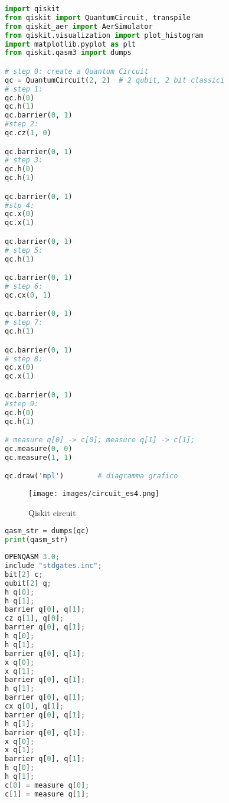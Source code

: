 \begin{lstlisting}[language=Python, caption={Qiskit code}, label={lst:qiskit-circuit}]
import qiskit
from qiskit import QuantumCircuit, transpile
from qiskit_aer import AerSimulator
from qiskit.visualization import plot_histogram
import matplotlib.pyplot as plt
from qiskit.qasm3 import dumps

# step 0: create a Quantum Circuit
qc = QuantumCircuit(2, 2)  # 2 qubit, 2 bit classici
# step 1:
qc.h(0)
qc.h(1)
qc.barrier(0, 1)
#step 2:
qc.cz(1, 0)

qc.barrier(0, 1)
# step 3:
qc.h(0)
qc.h(1)

qc.barrier(0, 1)
#stp 4:
qc.x(0)
qc.x(1)

qc.barrier(0, 1)
# step 5:
qc.h(1)

qc.barrier(0, 1)
# step 6:
qc.cx(0, 1)

qc.barrier(0, 1)
# step 7:
qc.h(1)

qc.barrier(0, 1)
# step 8:
qc.x(0)
qc.x(1)

qc.barrier(0, 1)
#step 9:
qc.h(0)
qc.h(1)

# measure q[0] -> c[0]; measure q[1] -> c[1];
qc.measure(0, 0)
qc.measure(1, 1)

qc.draw('mpl')        # diagramma grafico
\end{lstlisting}



\begin{figure}[H]
    \centering
    \texttt{[image: images/circuit\_es4.png]}
    \caption{Qiskit circuit}
    \label{fig:circuit es4}
\end{figure}




\begin{lstlisting}[language=Python, caption={Export circuit to QASM3}, label={lst:qasm-export}]
qasm_str = dumps(qc)
print(qasm_str)
\end{lstlisting}

\begin{lstlisting}[language=Python, caption={Output generato: OpenQASM 3}, label={lst:qasm3-output}, backgroundcolor=\color{bg}]
OPENQASM 3.0;
include "stdgates.inc";
bit[2] c;
qubit[2] q;
h q[0];
h q[1];
barrier q[0], q[1];
cz q[1], q[0];
barrier q[0], q[1];
h q[0];
h q[1];
barrier q[0], q[1];
x q[0];
x q[1];
barrier q[0], q[1];
h q[1];
barrier q[0], q[1];
cx q[0], q[1];
barrier q[0], q[1];
h q[1];
barrier q[0], q[1];
x q[0];
x q[1];
barrier q[0], q[1];
h q[0];
h q[1];
c[0] = measure q[0];
c[1] = measure q[1];
\end{lstlisting}